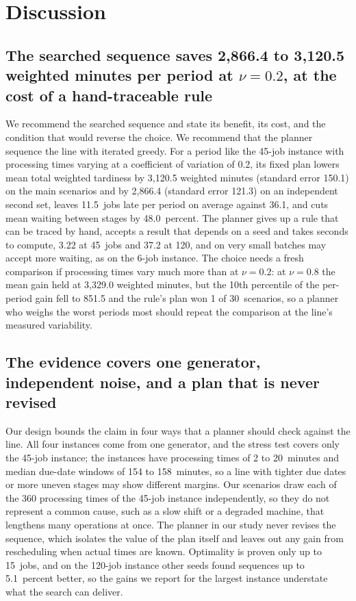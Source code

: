 \section{Discussion}\label{sec:discussion}

\subsection{The searched sequence saves 2,866.4 to 3,120.5 weighted minutes per period at \texorpdfstring{$\nu = 0.2$}{nu = 0.2}, at the cost of a hand-traceable rule}\label{sec:recommendation}

\sumpara We recommend the searched sequence and state its benefit, its cost, and the condition that would reverse the choice. \sumparaend
\fin We recommend that the planner sequence the line with iterated greedy. \fine
\fin For a period like the 45-job instance with processing times varying at a coefficient of variation of 0.2, its fixed plan lowers mean total weighted tardiness by 3,120.5 weighted minutes (standard error 150.1) on the main scenarios and by 2,866.4 (standard error 121.3) on an independent second set, leaves 11.5~jobs late per period on average against 36.1, and cuts mean waiting between stages by 48.0~percent. \fine
\fin The planner gives up a rule that can be traced by hand, accepts a result that depends on a seed and takes seconds to compute, 3.22 at 45~jobs and 37.2 at 120, and on very small batches may accept more waiting, as on the 6-job instance. \fine
\fin The choice needs a fresh comparison if processing times vary much more than at $\nu = 0.2$: at $\nu = 0.8$ the mean gain held at 3,329.0 weighted minutes, but the 10th percentile of the per-period gain fell to 851.5 and the rule's plan won 1 of 30~scenarios, so a planner who weighs the worst periods most should repeat the comparison at the line's measured variability. \fine

\subsection{The evidence covers one generator, independent noise, and a plan that is never revised}\label{sec:scope}

\sumpara Our design bounds the claim in four ways that a planner should check against the line. \sumparaend
\fin All four instances come from one generator, and the stress test covers only the 45-job instance; the instances have processing times of 2 to 20~minutes and median due-date windows of 154 to 158~minutes, so a line with tighter due dates or more uneven stages may show different margins. \fine
\fin Our scenarios draw each of the 360 processing times of the 45-job instance independently, so they do not represent a common cause, such as a slow shift or a degraded machine, that lengthens many operations at once. \fine
\fin The planner in our study never revises the sequence, which isolates the value of the plan itself and leaves out any gain from rescheduling when actual times are known. \fine
\fin Optimality is proven only up to 15~jobs, and on the 120-job instance other seeds found sequences up to 5.1~percent better, so the gains we report for the largest instance understate what the search can deliver. \fine

